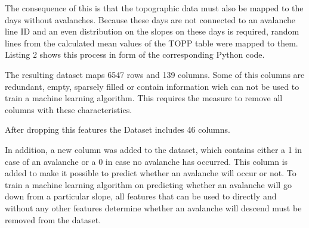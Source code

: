 \documentclass[12pt,a4paper]{article}
\begin{document}
The consequence of this is that the topographic data must also be mapped to the days without avalanches. Because these days are not connected to an avalanche line ID and an even distribution on the slopes on these days is required, random lines from the calculated mean values of the TOPP table were mapped to them. Listing 2 shows this process in form of the corresponding Python code.
 
The resulting dataset maps 6547 rows and 139 columns. Some of this columns are redundant, empty, sparsely filled or contain information wich can not be used to train a machine learning algorithm. This requires the measure to remove all columns with these characteristics. 

After dropping this features the Dataset includes 46 columns. 

In addition, a new column was added to the dataset, which contains either a 1 in case of an avalanche or a 0 in case no avalanche has occurred. This column is added to make it possible to predict  whether an avalanche will occur or not. To train a machine learning algorithm on predicting whether an avalanche will go down from a particular slope, all features that can be used to directly and without any other features determine whether an avalanche will descend must be removed from the dataset.


















\newpage
{}
\printbibliography
\end{document}
